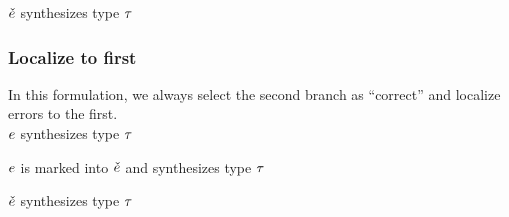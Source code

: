 \documentclass[formalism.tex]{subfiles}
\begin{document}
\judgbox{\ctxSynTypeM{\ctx}{\ECMV}{\TMV}} $\ECMV$ synthesizes type $\TMV$
%
\begin{mathpar}
\end{mathpar}

\subsubsection{Localize to first}
\label{sec:marked-alternative-conditionals-localize-first}
In this formulation, we always select the second branch as ``correct'' and localize errors to the
first. \\

\judgbox{\ctxSynTypeU{\ctx}{\EMV}{\TMV}} $\EMV$ synthesizes type $\TMV$
%
\begin{mathpar}
\end{mathpar}

\judgbox{\ctxSynFixedInto{\ctx}{\EMV}{\ECMV}{\TMV}} $\EMV$ is marked into $\ECMV$ and synthesizes type $\TMV$
%
\begin{mathpar}
\end{mathpar}

\judgbox{\ctxSynTypeM{\ctx}{\ECMV}{\TMV}} $\ECMV$ synthesizes type $\TMV$
%
\begin{mathpar}
\end{mathpar}
\end{document}
